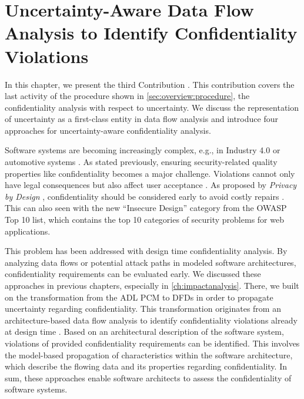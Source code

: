 \chapter{Uncertainty-Aware Data Flow Analysis to Identify Confidentiality Violations}%
\label{ch:confidentialityanalysis}%
 

In this chapter, we present the third Contribution .
This contribution covers the last activity of the procedure shown in \autoref{sec:overview:procedure}, the confidentiality analysis with respect to uncertainty.
We discuss the representation of uncertainty as a first-class entity in data flow analysis and introduce four approaches for uncertainty-aware confidentiality analysis.

Software systems are becoming increasingly complex, e.g., in Industry 4.0 \cite{boltz_context-based_2020} or automotive systems \cite{acosta_uncertainty_2022}.
As stated previously, ensuring security-related quality properties like confidentiality becomes a major challenge.
Violations cannot only have legal consequences \cite{isaak_user_2018} but also affect user acceptance \cite{weisbaum_trust_2018}.
As proposed by \emph{Privacy by Design} \cite{schaar_privacy_2010}, confidentiality should be considered early to avoid costly repairs \cite{boehm_software_2001}.
This can also seen with the new \enquote{Insecure Design} category from the \ac{OWASP} Top 10 \cite{OWASPTop10} list, which contains the top 10 categories of security problems for web applications. 

This problem has been addressed with design time confidentiality analysis.
By analyzing data flows \cite{seifermann_detecting_2022} or potential attack paths \cite{walter_architectural_2022-1,walter_architecture-based_2023-1} in modeled software architectures, confidentiality requirements \cite{hahner_modeling_2021} can be evaluated early.
We discussed these approaches in previous chapters, especially in \autoref{ch:impactanalysis}.
There, we built on the transformation from the \acf{ADL} \acf{PCM} to \acfp{DFD} in order to propagate uncertainty regarding confidentiality.
This transformation originates from an architecture-based data flow analysis to identify confidentiality violations already at design time \cite{seifermann_data-driven_2019,seifermann_detecting_2022,seifermann_architectural_2022}.
Based on an architectural description of the software system, violations of provided confidentiality requirements \cite{hahner_modeling_2021} can be identified.
This involves the model-based propagation of characteristics within the software architecture, which describe the flowing data and its properties regarding confidentiality.
In sum, these approaches enable software architects to assess the confidentiality of software systems.

